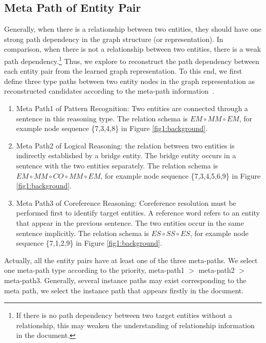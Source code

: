 \documentclass[letterpaper]{article} \usepackage{aaai21}  \usepackage{times}  \usepackage{helvet} \usepackage{courier}  \usepackage[hyphens]{url}  \usepackage{graphicx} \urlstyle{rm} \def\UrlFont{\rm}  \usepackage{natbib}  \usepackage{caption} \frenchspacing  \setlength{\pdfpagewidth}{8.5in}  \setlength{\pdfpageheight}{11in}  \usepackage{amsmath}
\begin{document}
\subsection{Meta Path of Entity Pair}
Generally, when there is a relationship between two entities, they should have one strong path dependency in the graph structure (or representation).
In comparison, when there is not a relationship between two entities, there is a weak path dependency.\footnote{If there is no path dependency between two target entities without a relationship, this may weaken the understanding of relationship information in the document.}
Thus, we explore to reconstruct the path dependency between each entity pair from the learned graph representation.
To this end, we first define three type paths between two entity nodes in the graph representation as reconstructed candidates according to the meta-path information~\cite{Sun2013MiningHI}.
\begin{enumerate}
\item[1)] Meta Path1 of Pattern Recognition: Two entities are connected through a sentence in this reasoning type. The relation schema is $EM \circ MM \circ EM$, for example node sequence \{7,3,4,8\} in Figure \ref{fig1:background}.

\item[2)] Meta Path2 of Logical Reasoning: the relation between two entities is indirectly established by a bridge entity. The bridge entity occurs in a sentence with the two entities separately. The relation schema is $EM \circ MM \circ CO \circ MM \circ EM$, for example node sequence \{7,3,4,5,6,9\} in Figure \ref{fig1:background}.

\item[3)] Meta Path3 of Coreference Reasoning: Coreference resolution must be performed first to identify target entities. A reference word refers to an entity that appear in the previous sentence. The two entities occur in the same sentence implicitly. The relation schema is $ES \circ SS \circ ES$, for example node sequence \{7,1,2,9\} in Figure \ref{fig1:background}.
\end{enumerate}
Actually, all the entity pairs have at least one of the three meta-paths. We select one meta-path type according to the priority, meta-path1 $>$ meta-path2 $>$ meta-path3.
Generally, several instance paths may exist corresponding to the meta path, we select the instance path that appears firstly in the document.
\end{document}
